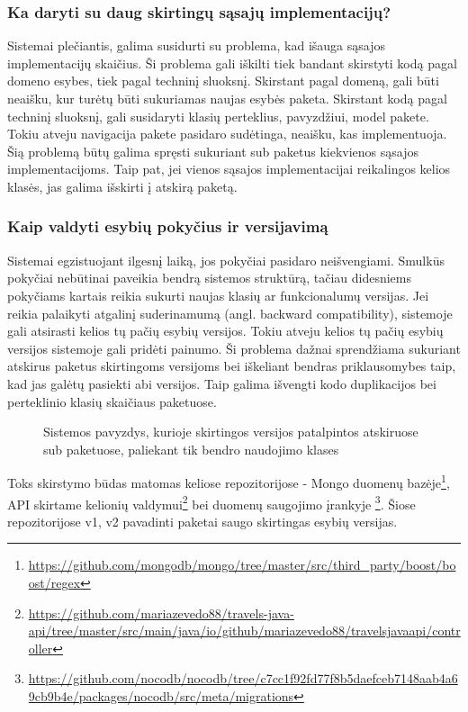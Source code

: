 \subsubsection{Ka daryti su daug skirtingų sąsajų implementacijų?}
Sistemai plečiantis, galima susidurti su problema, kad išauga sąsajos implementacijų skaičius. Ši problema gali iškilti
tiek bandant skirstyti kodą pagal domeno esybes, tiek pagal techninį sluoksnį. Skirstant pagal domeną, gali būti neaišku, kur turėtų
būti sukuriamas naujas esybės paketa. Skirstant kodą pagal techninį sluoksnį, gali susidaryti klasių perteklius, pavyzdžiui,
model pakete. Tokiu atveju navigacija pakete pasidaro sudėtinga, neaišku, kas implementuoja. Šią problemą būtų galima spręsti sukuriant
sub paketus kiekvienos sąsajos implementacijoms. Taip pat, jei vienos sąsajos implementacijai reikalingos kelios klasės, jas galima
išskirti į atskirą paketą.

\subsubsection{Kaip valdyti esybių pokyčius ir versijavimą}
Sistemai egzistuojant ilgesnį laiką, jos pokyčiai pasidaro neišvengiami. Smulkūs pokyčiai nebūtinai paveikia bendrą sistemos struktūrą, tačiau
didesniems pokyčiams kartais reikia sukurti naujas klasių ar funkcionalumų versijas. Jei reikia palaikyti atgalinį
suderinamumą (angl. backward compatibility), sistemoje gali atsirasti kelios tų pačių esybių versijos.
Tokiu atveju kelios tų pačių esybių versijos sistemoje gali pridėti painumo. Ši problema dažnai sprendžiama sukuriant atskirus paketus skirtingoms
versijoms bei iškeliant bendras priklausomybes taip, kad jas galėtų pasiekti abi versijos. Taip galima išvengti kodo duplikacijos bei perteklinio
klasių skaičiaus paketuose.
\begin{figure}[H]
    \snugshade
    \endsnugshade
    \caption{Sistemos pavyzdys, kurioje skirtingos versijos patalpintos atskiruose sub paketuose, paliekant tik bendro naudojimo klases}
\end{figure}
Toks skirstymo būdas matomas keliose repozitorijose - Mongo duomenų bazėje\footnote{\url{https://github.com/mongodb/mongo/tree/master/src/third_party/boost/boost/regex}},
API skirtame kelionių valdymui\footnote{\url{https://github.com/mariazevedo88/travels-java-api/tree/master/src/main/java/io/github/mariazevedo88/travelsjavaapi/controller}}
 bei duomenų saugojimo įrankyje \footnote{\url{https://github.com/nocodb/nocodb/tree/c7cc1f92fd77f8b5daefceb7148aab4a69cb9b4e/packages/nocodb/src/meta/migrations}}.
Šiose repozitorijose v1, v2 pavadinti paketai saugo skirtingas esybių versijas.